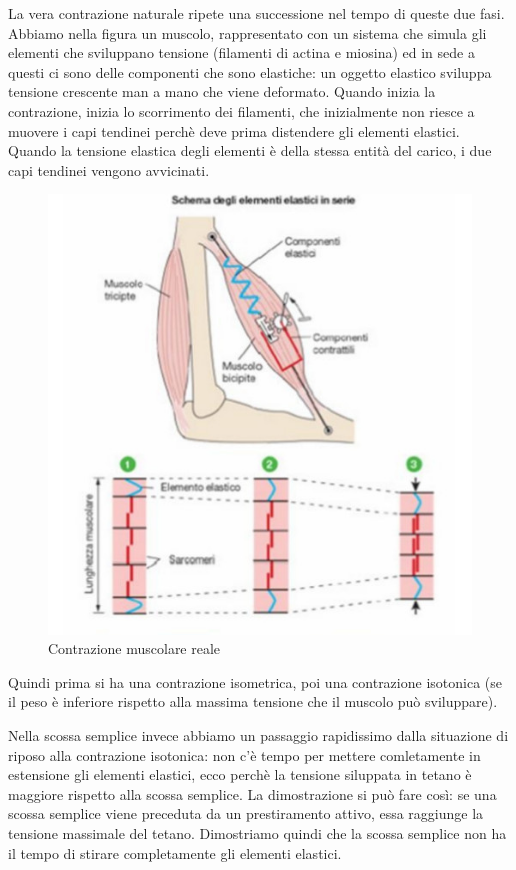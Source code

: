 \documentclass[a4paper,12pt]{article}
\begin{document}
La vera contrazione naturale ripete una successione nel tempo di queste due fasi. Abbiamo nella figura un muscolo, rappresentato con un sistema che simula gli elementi che sviluppano tensione (filamenti di actina e miosina) ed in sede a questi ci sono delle componenti che sono elastiche: un oggetto elastico sviluppa tensione crescente man a mano che viene deformato. Quando inizia la contrazione, inizia lo scorrimento dei filamenti, che inizialmente non riesce a muovere i capi tendinei perchè deve prima distendere gli elementi elastici. Quando la tensione elastica degli elementi è della stessa entità del carico, i due capi tendinei vengono avvicinati. 
\begin{figure}[H]
\centering
\includegraphics[scale=0.4]{immagine/contrazione1.jpg}
\caption{Contrazione muscolare reale}
\end{figure}

Quindi prima si ha una contrazione isometrica, poi una contrazione isotonica (se il peso è inferiore rispetto alla massima tensione che il muscolo può sviluppare). 

Nella scossa semplice invece abbiamo un passaggio rapidissimo dalla situazione di riposo alla contrazione isotonica: non c'è tempo per mettere comletamente in estensione gli elementi elastici, ecco perchè la tensione siluppata in tetano è maggiore rispetto alla scossa semplice. La dimostrazione si può fare così: se una scossa semplice viene preceduta da un prestiramento attivo, essa raggiunge la tensione massimale del tetano. Dimostriamo quindi che la scossa semplice non ha il tempo di stirare completamente gli elementi elastici.
\end{document}
